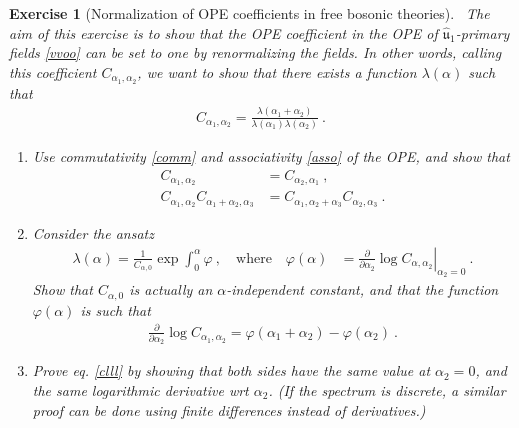 \documentclass[12pt, a4paper, notitlepage, twoside]{report}
\numberwithin{equation}{section}
\theoremstyle{break}
\newtheorem{exo}{Exercise}[chapter]
\begin{document}
\begin{exo}[Normalization of OPE coefficients in free bosonic theories]
 ~\label{exoone}
The aim of this exercise is to show that the OPE coefficient in the OPE of $\hat{\mathfrak{u}}_1$-primary fields \eqref{vvoo} can be set to one by renormalizing the fields.
In other words, calling this coefficient $C_{\alpha_1,\alpha_2}$, we want to show that there exists a function $\lambda(\alpha)$ such that 
\begin{align}
 C_{\alpha_1,\alpha_2} = \frac{\lambda(\alpha_1+\alpha_2)}{\lambda(\alpha_1)\lambda(\alpha_2)}\ .
\label{clll}
\end{align}
\begin{enumerate}
 \item Use commutativity \eqref{comm} and associativity \eqref{asso} of the OPE, and show that 
\begin{align}
C_{\alpha_1,\alpha_2} &= C_{\alpha_2,\alpha_1}\ ,
\\
 C_{\alpha_1,\alpha_2}C_{\alpha_1+\alpha_2,\alpha_3} &= C_{\alpha_1,\alpha_2+\alpha_3}C_{\alpha_2,\alpha_3}\ .
\end{align}

\item Consider the ansatz
\begin{align}
  \lambda(\alpha) = \frac{1}{C_{\alpha,0}} \exp \int_0^{\alpha} \varphi \ , \quad \text{where}\quad  
 \varphi(\alpha)&=\left.{\frac{\partial}{\partial \alpha_2}}\log C_{\alpha,\alpha_2}\right|_{\alpha_2=0}\ .
\end{align}
Show that $C_{\alpha,0}$ is actually an $\alpha$-independent constant, and that the function $\varphi(\alpha)$ is such that
\begin{align}
 {\frac{\partial}{\partial \alpha_2}} \log C_{\alpha_1,\alpha_2}  = \varphi(\alpha_1+\alpha_2)-\varphi(\alpha_2)\ . 
\end{align}

\item
Prove eq. \eqref{clll} by showing that both sides have the same value at $\alpha_2=0$, and the same logarithmic derivative wrt $\alpha_2$. 
(If the spectrum is discrete, a similar proof can be done using finite differences instead of derivatives.) 
\end{enumerate}
\end{exo}
\end{document}
